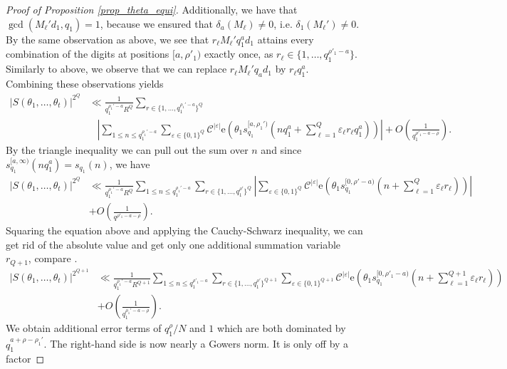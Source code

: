 \documentclass[12pt]{amsart}
\renewcommand{\leq}{\leqslant}
\theoremstyle{definition}
\numberwithin{equation}{section}
\newcommand\e{\mathrm{e}}
\numberwithin{equation}{section}
\begin{document}
\begin{proof}[Proof of Proposition \ref{prop_theta_equi}]
	Additionally, we have that $\gcd(M_{\ell}'d_1, q_1)=1$, because we ensured that $\delta_a(M_{\ell})\neq 0$, i.e. $\delta_1(M_{\ell}')\neq 0$. By the same observation as above, we see that $r_{\ell}M_{\ell}'q_1^{a}d_1$ attains every combination of the digits at positions $[a,\rho'_1)$ exactly once, as $r_{\ell}\in \{1,\dots,q_1^{\rho'_1-a}\}$. Similarly to above, we observe that we can replace $r_{\ell}M_{\ell}'q_{a}d_1$ by $r_{\ell}q_1^{a}$.\\
	Combining these observations yields
	\begin{align*}
		|S(\theta_1, \dots, \theta_t)|^{2^Q} &\ll \frac {1}{q_1^{\rho_1'-a}R^Q} \sum_{r\in\{1,\dots,q_1^{\rho_1'-a}\}^Q} \\
		&\hspace{10pt}\left|\sum_{1\leq n \leq q_1^{\rho_1'-a}} \sum_{\varepsilon\in \{0,1\}^Q}\mathcal{C}^{|\varepsilon|} \e\left(\theta_1 s_{q_1}^{[a,\rho_1')}\left(nq_1^{a}+\sum_{\ell=1}^{Q}\varepsilon_{\ell}r_{\ell}q_1^{a}\right)\right)\right|+ O\left(\frac{1}{q_1^{\rho'_1-a-\rho}}\right).
	\end{align*}
	By the triangle inequality we can pull out the sum over $n$ and since $s_{q_1}^{[a,\infty)}\left(nq_1^{a}\right)=s_{q_1}\left(n\right)$, we have
	\begin{align*}
		|S(\theta_1, \dots, \theta_t)|^{2^Q} &\ll \frac {1}{q_1^{\rho_1'-a}R^Q} \sum_{1\leq n \leq q_1^{\rho_1'-a}} \sum_{r\in\{1,\dots,q_1^{\rho'}\}^Q}\left| \sum_{\varepsilon\in \{0,1\}^Q}\mathcal{C}^{|\varepsilon|} \e\left(\theta_1 s_{q_1}^{[0,\rho'-a)}\left(n+\sum_{\ell=1}^{Q}\varepsilon_{\ell}r_{\ell}\right)\right)\right| \\
		&+ O\left(\frac{1}{q^{\rho'_1-a-\rho}}\right).
	\end{align*}
	Squaring the equation above and applying the Cauchy-Schwarz inequality, we can get rid of the absolute value and get only one additional summation variable $r_{Q+1}$, compare \cite{DrmotaSpiegelhofer2025}.
	\begin{align*}
		|S(\theta_1, \dots, \theta_t)|^{2^{Q+1}} &\ll \frac {1}{q_1^{\rho_1'-a}R^{Q+1}} \sum_{1\leq n \leq q_1^{\rho'_1-a}}  \sum_{r\in\{1,\dots,q_1^{\rho'}\}^{Q+1}} \sum_{\varepsilon\in \{0,1\}^{Q+1}}\mathcal{C}^{|\varepsilon|}
		\e\left(\theta_1 s_{q_1}^{[0,\rho'_1-a)}\left(n+\sum_{\ell=1}^{Q+1}\varepsilon_{\ell}r_{\ell}\right)\right)\\ 
		&+ O\left(\frac{1}{q_1^{\rho_1'-a-\rho}} \right).
	\end{align*}
	We obtain additional error terms of $q_1^{\rho}/N $ and $1$ which are both dominated by $q_1^{a+\rho-\rho_1'}$. The right-hand side is now nearly a Gowers norm. It is only off by a factor

\end{proof}
\end{document}
